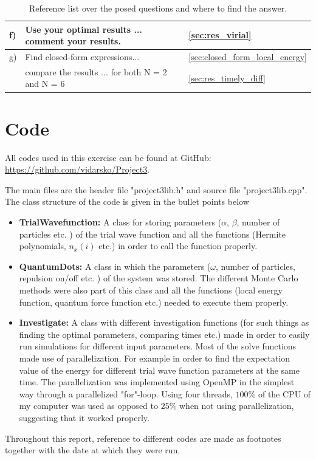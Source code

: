 \documentclass[a4paper,10pt,english]{article}
\numberwithin{figure}{subsection}
\numberwithin{table}{subsection}
\numberwithin{equation}{subsection}
\begin{document}
\begin{appendices}
\begin{table}[h!]
\begin{tabular}{lll}
        \midrule 
        f) & Use your optimal results ... comment your results. & \ref{sec:res_virial}\\
        \midrule
        g) &  Find closed-form expressions... & \ref{sec:closed_form_local_energy} \\
           & compare the results ... for both N = 2 and N = 6 & \ref{sec:res_timely_diff} \\
        \bottomrule
        \end{tabular}
        \caption{Reference list over the posed questions and where to find the answer.}
\end{table}



\clearpage


\section{Code} \label{sec:codes}
All codes used in this exercise can be found at GitHub: \newline
\url{https://github.com/vidarsko/Project3}.

The main files are the header file "project3lib.h" and source file "project3lib.cpp". 
The class structure of the code is given in the bullet points below

\begin{itemize}
    \item \textbf{TrialWavefunction:} A class for storing parameters ($\alpha$, $\beta$, number of particles etc. ) of the trial wave function and all the functions (Hermite polynomials, $n_x(i)$ etc.) in order to call the function properly.
    \item \textbf{QuantumDots:} A class in which the parameters ($\omega$, number of particles, repulsion on/off etc. ) of the system was stored. The different Monte Carlo methods were also part of this class and all the functions (local energy function, quantum force function etc.) needed to execute them properly. 
    \item \textbf{Investigate:} A class with different investigation functions (for such things as finding the optimal parameters, comparing times etc.) made in order to easily run simulations for different input parameters. Most of the solve functions made use of parallelization. For example in order to find the expectation value of the energy for different trial wave function parameters at the same time. 
    The parallelization was implemented using OpenMP in the simplest way through a parallelized "for"-loop. Using four threads, $100 \%$ of the CPU of my computer was used as opposed to $25\%$ when not using parallelization, suggesting that it worked properly.
\end{itemize}

Throughout this report, reference to different codes are made as footnotes together with the date at which they were run. 

\end{appendices}
\end{document}
